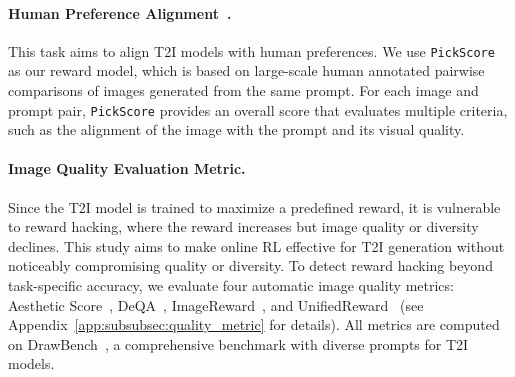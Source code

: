 \paragraph{Human Preference Alignment~\cite{kirstain2023pick}.} \label{subsec:exp-human_preference}
This task aims to align T2I models with human preferences. We use \texttt{PickScore}~\cite{kirstain2023pick} as our reward model, which is based on large-scale human annotated pairwise comparisons of images generated from the same prompt. For each image and prompt pair, \texttt{PickScore} provides an overall score that evaluates multiple criteria, such as the alignment of the image with the prompt and its visual quality.

\paragraph{Image Quality Evaluation Metric.}
Since the T2I model is trained to maximize a predefined reward, it is vulnerable to reward hacking, where the reward increases but image quality or diversity declines. This study aims to make online RL effective for T2I generation without noticeably compromising quality or diversity. To detect reward hacking beyond task-specific accuracy, we evaluate four automatic image quality metrics: Aesthetic Score~\cite{schuhmann2022laion}, DeQA~\cite{deqa}, ImageReward~\cite{xu2024imagereward}, and UnifiedReward~\cite{wang2025unified} (see Appendix~\ref{app:subsubsec:quality_metric} for details). All metrics are computed on DrawBench~\cite{drawbench}, a comprehensive benchmark with diverse prompts for T2I models.
